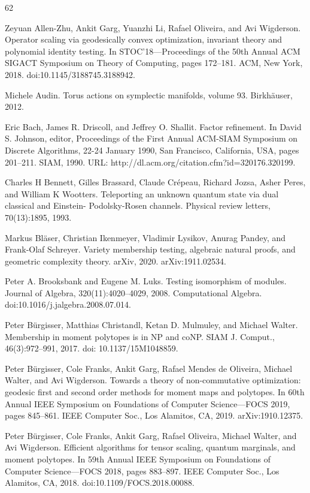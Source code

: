 \documentclass[10pt,a4paper]{article}
\theoremstyle{definition}
\numberwithin{equation}{section}
\begin{document}
\begin{thebibliography}{62}

Zeyuan Allen-Zhu, Ankit Garg, Yuanzhi Li, Rafael Oliveira, and Avi Wigderson. Operator scaling via geodesically convex optimization, invariant theory and polynomial identity testing. In STOC’18—Proceedings of the 50th Annual ACM SIGACT Symposium on Theory of Computing, pages 172–181. ACM, New York, 2018. doi:10.1145/3188745.3188942.

Michele Audin. Torus actions on symplectic manifolds, volume 93. Birkhäuser, 2012.

Eric Bach, James R. Driscoll, and Jeffrey O. Shallit. Factor refinement. In David S. Johnson, editor, Proceedings of the First Annual ACM-SIAM Symposium on Discrete Algorithms, 22-24 January 1990, San Francisco, California, USA, pages 201–211. SIAM, 1990. URL: http://dl.acm.org/citation.cfm?id=320176.320199.

Charles H Bennett, Gilles Brassard, Claude Crépeau, Richard Jozsa, Asher Peres, and William K Wootters. Teleporting an unknown quantum state via dual classical and Einstein- Podolsky-Rosen channels. Physical review letters, 70(13):1895, 1993.

Markus Bläser, Christian Ikenmeyer, Vladimir Lysikov, Anurag Pandey, and Frank-Olaf Schreyer. Variety membership testing, algebraic natural proofs, and geometric complexity theory. arXiv, 2020. arXiv:1911.02534.

Peter A. Brooksbank and Eugene M. Luks. Testing isomorphism of modules. Journal of Algebra, 320(11):4020–4029, 2008. Computational Algebra. doi:10.1016/j.jalgebra.2008.07.014.

Peter Bürgisser, Matthias Christandl, Ketan D. Mulmuley, and Michael Walter. Membership in moment polytopes is in NP and coNP. SIAM J. Comput., 46(3):972–991, 2017. doi: 10.1137/15M1048859.

Peter Bürgisser, Cole Franks, Ankit Garg, Rafael Mendes de Oliveira, Michael Walter, and Avi Wigderson. Towards a theory of non-commutative optimization: geodesic first and second order methods for moment maps and polytopes. In 60th Annual IEEE Symposium on Foundations of Computer Science—FOCS 2019, pages 845–861. IEEE Computer Soc., Los Alamitos, CA, 2019. arXiv:1910.12375.

Peter Bürgisser, Cole Franks, Ankit Garg, Rafael Oliveira, Michael Walter, and Avi Wigderson. Efficient algorithms for tensor scaling, quantum marginals, and moment polytopes. In 59th Annual IEEE Symposium on Foundations of Computer Science—FOCS 2018, pages 883–897. IEEE Computer Soc., Los Alamitos, CA, 2018. doi:10.1109/FOCS.2018.00088.


\end{thebibliography}
\end{document}
